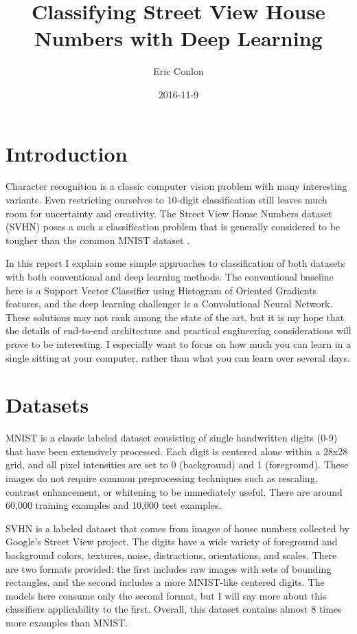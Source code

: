 \documentclass{article}
\begin{document}
\author{Eric Conlon}
\title{Classifying Street View House Numbers with Deep Learning}
\date{2016-11-9}

\maketitle{} %

\tableofcontents{} %

\section{Introduction}

Character recognition is a classic computer vision problem with many interesting variants. Even restricting ourselves to 10-digit classification still leaves much room for uncertainty and creativity. The Street View House Numbers dataset (SVHN) \cite{netzer2011reading} poses a such a classification problem that is generally considered to be tougher than the common MNIST dataset \cite{lecun1998mnist}.

In this report I explain some simple approaches to classification of both datasets with both conventional and deep learning methods. The conventional baseline here is a Support Vector Classifier using Histogram of Oriented Gradients features, and the deep learning challenger is a Convolutional Neural Network. These solutions may not rank among the state of the art, but it is my hope that the details of end-to-end architecture and practical engineering considerations will prove to be interesting. I especially want to focus on how much you can learn in a single sitting at your computer, rather than what you can learn over several days.

\section{Datasets}

MNIST is a classic labeled dataset consisting of single handwritten digits (0-9) that have been extensively processed. Each digit is centered alone within a 28x28 grid, and all pixel intensities are set to 0 (background) and 1 (foreground). These images do not require common preprocessing techniques such as rescaling, contrast enhancement, or whitening to be immediately useful. There are around 60,000 training examples and 10,000 test examples.

SVHN is a labeled dataset that comes from images of house numbers collected by Google's Street View project. The digits have a wide variety of foreground and background colors, textures, noise, distractions, orientations, and scales. There are two formats provided: the first includes raw images with sets of bounding rectangles, and the second includes a more MNIST-like centered digits. The models here consume only the second format, but I will say more about this classifiers applicability to the first. Overall, this dataset contains almost 8 times more examples than MNIST.
\end{document}
